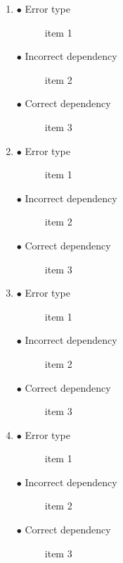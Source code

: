 \documentclass[]{article}
\begin{document}
\begin{enumerate}
\begin{enumerate}
		\begin{enumerate}
				\item 
					\begin{description}
						\item[$\bullet$ Error type] item 1
						\item[$\bullet$ Incorrect dependency] item 2
						\item[$\bullet$ Correct dependency] item 3
					\end{description}
				\item 
					\begin{description}
						\item[$\bullet$ Error type] item 1
						\item[$\bullet$ Incorrect dependency] item 2
						\item[$\bullet$ Correct dependency] item 3
					\end{description}
				\item 
					\begin{description}
						\item[$\bullet$ Error type] item 1
						\item[$\bullet$ Incorrect dependency] item 2
						\item[$\bullet$ Correct dependency] item 3
					\end{description}
				\item 
					\begin{description}
						\item[$\bullet$ Error type] item 1
						\item[$\bullet$ Incorrect dependency] item 2
						\item[$\bullet$ Correct dependency] item 3
					\end{description}
			\end{enumerate}	
	\end{enumerate}	
\end{enumerate}
\end{document}
